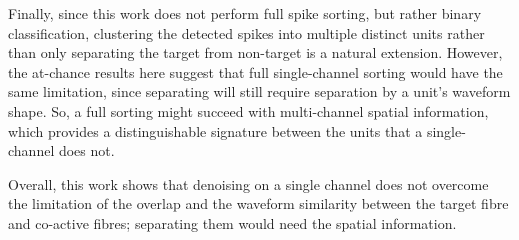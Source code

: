 \documentclass[ %
                    author={Rzan Alkabier},
                    supervisor={Dr. Zahraa Abdallah},
                    degree={MSc},
                     title={Denoising Extracellular Recording for Spike Detection and Classification on Single Channels},
                    subtitle={Does denoising improve detection and classification performance?},
                      type={},
                      year={2026}]{dissertation}
\begin{document}
\noindent
Finally, since this work does not perform full spike sorting, but rather binary classification, clustering the detected spikes into multiple distinct units rather than only separating the target from non-target is a natural extension. However, the at-chance results here suggest that full single-channel sorting would have the same limitation, since separating will still require separation by a unit's waveform shape. So, a full sorting might succeed with multi-channel spatial information, which provides a distinguishable signature between the units that a single-channel does not.

Overall, this work shows that denoising on a single channel does not overcome the limitation of the overlap and the waveform similarity between the target fibre and co-active fibres; separating them would need the spatial information.  

%
%

\backmatter





\appendix
\end{document}
